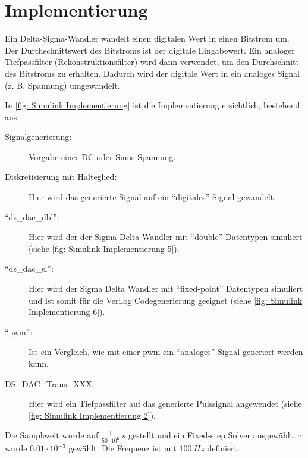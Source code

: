 \documentclass[./\jobname.tex]{subfiles}
\begin{document}
\section{Implementierung}
%
Ein Delta-Sigma-Wandler wandelt einen digitalen Wert in einen Bitstrom um. Der Durchschnittswert des Bitstroms ist der digitale Eingabewert. Ein analoger Tiefpassfilter (Rekonstruktionsfilter) wird dann verwendet, um den Durchschnitt des Bitstroms zu erhalten. Dadurch wird der digitale Wert in ein analoges Signal (z. B. Spannung) umgewandelt.\par
%
In \autoref{fig: Simulink Implementierung} ist die Implementierung ersichtlich, bestehend aus:
%
\begin{description}
	\item[Signalgenerierung:] Vorgabe einer DC oder Sinus Spannung.
	\item[Diskretisierung mit Halteglied:] Hier wird das generierte Signal auf ein \enquote{digitales} Signal gewandelt.
	\item[\enquote{ds\_dac\_dbl}:] Hier wird der der Sigma Delta Wandler mit \enquote{double} Datentypen simuliert (siehe \autoref{fig: Simulink Implementierung 5}).
	\item[\enquote{ds\_dac\_sl}:] Hier wird der Sigma Delta Wandler mit \enquote{fixed-point} Datentypen simuliert und ist somit für die Verilog Codegenerierung geeignet (siehe \autoref{fig: Simulink Implementierung 6}).
	\item[\enquote{\gls{pwm}}:] Ist ein Vergleich, wie mit einer \gls{pwm} ein \enquote{analoges} Signal generiert werden kann.
	\item[DS\_DAC\_Trans\_XXX:] Hier wird ein Tiefpassfilter auf das generierte Pulssignal angewendet (siehe \autoref{fig: Simulink Implementierung 2}).
\end{description}
%
Die Samplezeit wurde auf \(\frac{1}{50\cdot 10^{6}}~s\) gestellt und ein Fixed-step Solver ausgewählt. \(\tau\) wurde \(0.01 \cdot 10^{-3}\) gewählt. Die Frequenz ist mit \(100~Hz\) definiert.
%
%
\begin{figure}[H]
	\centering
	\noindent{}
	\label{fig: Simulink Implementierung}
\end{figure}
%
\begin{figure}[H]
	\centering
	\noindent{}
	\label{fig: Simulink Implementierung 2}
\end{figure}
\end{document}
